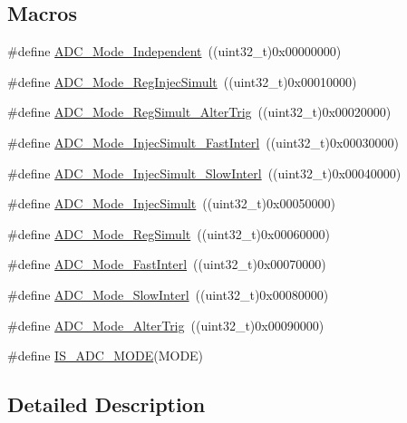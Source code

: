 \subsection*{Macros}
\begin{DoxyCompactItemize}
\item 
\#define \hyperlink{group___a_d_c__mode_ga2754d3a35559dc10e3d6a7d920e83432}{A\+D\+C\+\_\+\+Mode\+\_\+\+Independent}~((uint32\+\_\+t)0x00000000)
\item 
\#define \hyperlink{group___a_d_c__mode_ga487d5f0c506291c5d37b53198396fd1c}{A\+D\+C\+\_\+\+Mode\+\_\+\+Reg\+Injec\+Simult}~((uint32\+\_\+t)0x00010000)
\item 
\#define \hyperlink{group___a_d_c__mode_gae3d5fbf93f60d75534364bf9db78f632}{A\+D\+C\+\_\+\+Mode\+\_\+\+Reg\+Simult\+\_\+\+Alter\+Trig}~((uint32\+\_\+t)0x00020000)
\item 
\#define \hyperlink{group___a_d_c__mode_ga2fc8a737f7b2375309bccbcb7fdbbfeb}{A\+D\+C\+\_\+\+Mode\+\_\+\+Injec\+Simult\+\_\+\+Fast\+Interl}~((uint32\+\_\+t)0x00030000)
\item 
\#define \hyperlink{group___a_d_c__mode_gacb72230cb48a577907729d426be69c22}{A\+D\+C\+\_\+\+Mode\+\_\+\+Injec\+Simult\+\_\+\+Slow\+Interl}~((uint32\+\_\+t)0x00040000)
\item 
\#define \hyperlink{group___a_d_c__mode_ga2339cc471aaf2db02daa4aeb49e9f0d9}{A\+D\+C\+\_\+\+Mode\+\_\+\+Injec\+Simult}~((uint32\+\_\+t)0x00050000)
\item 
\#define \hyperlink{group___a_d_c__mode_ga71298f7453c2b4392a9c622328b3c93d}{A\+D\+C\+\_\+\+Mode\+\_\+\+Reg\+Simult}~((uint32\+\_\+t)0x00060000)
\item 
\#define \hyperlink{group___a_d_c__mode_ga843ecdd53625e2088e91819e43106a7a}{A\+D\+C\+\_\+\+Mode\+\_\+\+Fast\+Interl}~((uint32\+\_\+t)0x00070000)
\item 
\#define \hyperlink{group___a_d_c__mode_ga8b81e27e98dbc3d1e31452dbad167cd5}{A\+D\+C\+\_\+\+Mode\+\_\+\+Slow\+Interl}~((uint32\+\_\+t)0x00080000)
\item 
\#define \hyperlink{group___a_d_c__mode_ga5595f12dc485e301ba3bad0e165586c1}{A\+D\+C\+\_\+\+Mode\+\_\+\+Alter\+Trig}~((uint32\+\_\+t)0x00090000)
\item 
\#define \hyperlink{group___a_d_c__mode_ga4abf4c7de28a42d7b124c9e403a6e537}{I\+S\+\_\+\+A\+D\+C\+\_\+\+M\+O\+DE}(M\+O\+DE)
\end{DoxyCompactItemize}


\subsection{Detailed Description}


